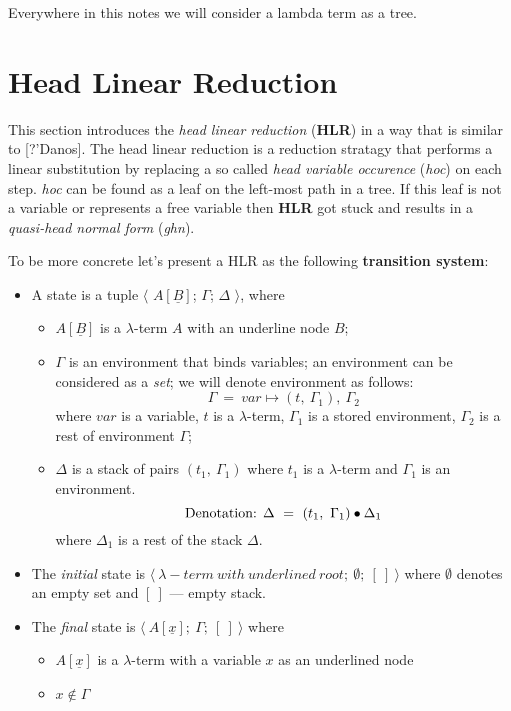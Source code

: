 \documentclass[a4paper, 10pt]{article}
\begin{document}
Everywhere in this notes we will consider a lambda term as a tree.

\section{Head Linear Reduction}

This section introduces the \emph{head linear reduction} (\textbf{HLR}) in a way that
is similar to [?'Danos].
The head linear reduction is a reduction stratagy that performs a linear substitution
by replacing a so called \emph{head variable occurence} (\emph{hoc}) on each step.
\emph{hoc} can be found as a leaf on the left-most path in a tree. If this leaf is not
a variable or represents a free variable then \textbf{HLR} got stuck and results in a
\emph{quasi-head normal form} (\emph{ghn}).

To be more concrete let's present a HLR as the following \textbf{transition system}:
\begin{itemize}
\item A state is a tuple $\langle$ $A[\underline{B}]$; $\Gamma$; $\Delta$ $\rangle$, where
  \begin{itemize}
  \item $A[\underline{B}]$ is a $\lambda$-term $A$ with an underline node $B$;
  \item $\Gamma$ is an environment that binds variables; an environment can be considered
    as a \emph{set}; we will denote environment as follows:
    $$\Gamma \ = \ var \mapsto (t,\ \Gamma_1),\ \Gamma_2$$ where
    $var$ is a variable, $t$ is a $\lambda$-term, $\Gamma_1$ is a stored environment,
    $\Gamma_2$ is a rest of environment $\Gamma$;
  \item $\Delta$ is a stack of pairs $(t_1, \ \Gamma_1)$ where $t_1$ is a $\lambda$-term and
    $\Gamma_1$ is an environment.
    $$\textnormal{Denotation: } \Delta \ = \ (t_1,\ \Gamma_1) \bullet \Delta_1$$
    where $\Delta_1$ is a rest of the stack $\Delta$.
  \end{itemize}
\item The \emph{initial} state is $\langle\ \lambda-term\ with\ underlined\ root;\ \emptyset;\ [\ ]\ \rangle$
  where $\emptyset$ denotes an empty set and $[\ ]$ --- empty stack.
\item The \emph{final} state is $\langle\ A [\underline{x}];\ \Gamma;\ [\ ]\ \rangle$ where
  \begin{itemize}
  \item $A [\underline{x}]$ is a $\lambda$-term with a variable $x$ as an underlined node
  \item $x \not\in \Gamma$
  \end{itemize}
\end{itemize}
\end{document}
